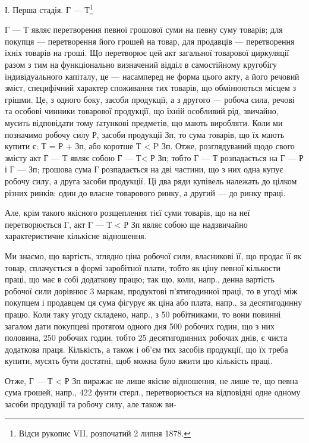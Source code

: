 І. Перша стадія. Г — Т\footnote{
Відси рукопис VII, розпочатий 2 липня 1878.
}

Г — Т являє перетворення певної грошової суми на певну суму товарів; для покупця — перетворення його
грошей на товар, для продавців — перетворення їхніх товарів на гроші. Що перетворює цей акт
загальної товарової циркуляції разом з тим на функціонально визначений відділ в самостійному
кругобігу індивідуального капіталу, це — насамперед не форма цього акту, а його речовий зміст,
специфічний характер
споживання тих товарів, що обмінюються місцем з грішми. Це, з одного боку, засоби продукції, а з
другого — робоча сила, речові та особові чинники товарової продукції, що їхній особливий рід,
звичайно, мусить відповідати тому ґатункові предметів, що мають виробляти. Коли ми позначимо робочу
силу Р, засоби продукції Зп, то сума товарів, що їх мають купити є: Т = Р + Зп, або коротше Т <  P
Зп. Отже, розглядуваний щодо свого змісту акт Г — Т являє собою Г — Т< Р Зп; тобто Г — Т
розпадається на Г — Р і Г — Зп; грошова сума Г розпадається на дві частини, що з них одна купує
робочу силу, а друга засоби продукції. Ці два ряди купівель належать до цілком різних ринків: один
до власне товарового ринку, а другий — до ринку праці.

Але, крім такого якісного розщеплення тієї суми товарів, що на неї перетворюється Г, акт Г — Т  < Р
Зп являє собою ще надзвичайно характеристичне кількісне відношення.

Ми знаємо, що вартість, зглядно ціна робочої сили, власникові її, що продає її як товар, сплачується
в формі заробітної плати, тобто як ціну певної кількости праці, що має в собі додаткову працю; так
що, коли, напр., денна вартість робочої сили дорівнює 3 маркам, продуктові п’ятигодинної праці, то в
угоді між покупцем і продавцем ця сума фігурує як ціна або плата, напр., за десятигодинну працю.
Коли таку угоду складено, напр., з 50 робітниками, то вони повинні загалом дати покупцеві протягом
одного дня 500 робочих годин, що з них половина, 250 робочих годин, тобто 25 десятигодинних робочих
днів, є чиста додаткова праця. Кількість, а також і об’єм тих засобів продукції,
що їх треба купити, мусять бути достатні, щоб можна було вжити цю кількість праці.

Отже, Г — Т < Р Зп виражає не лише якісне відношення, не лише те, що певна сума грошей, напр., 422
фунти стерл., перетворюється на відповідні одне одному засоби продукції та робочу силу, але також
ви-